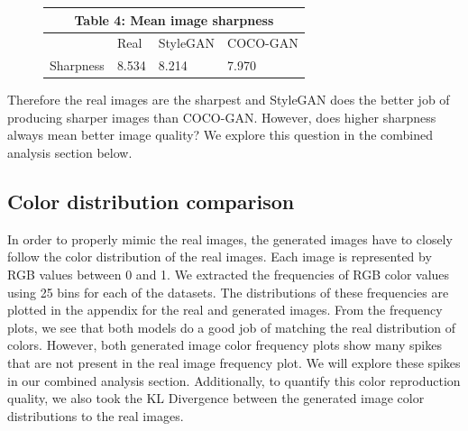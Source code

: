 \documentclass{article}
\begin{document}
        \begin{figure}[H]
            \centering
            \begin{tabular}{ |p{2cm}|p{2cm}|p{2cm}|p{2cm}|  }
                 \hline
                 \multicolumn{4}{|c|}{Table 4: Mean image sharpness} \\
                 \hline
                & Real & StyleGAN & COCO-GAN  \\
                \hline
                Sharpness & 8.534    & 8.214      & 7.970\\
                \hline
            \end{tabular}
        \end{figure}
        
        Therefore the real images are the sharpest and StyleGAN does the better job of producing sharper images than COCO-GAN.
        However, does higher sharpness always mean better image quality?
        We explore this question in the combined analysis section below.

        \subsection{Color distribution comparison}
        \label{subsec:colorDistribution}
        In order to properly mimic the real images, the generated images have to closely follow the color distribution of the real images. Each image is represented by RGB values between 0 and 1. We extracted the frequencies of RGB color values using 25 bins for each of the datasets. The distributions of these frequencies are plotted in the appendix for the real and generated images. 
        From the frequency plots, we see that both models do a good job of matching the real distribution of colors.
        However, both generated image color frequency plots show many spikes that are not present in the real image frequency plot.
        We will explore these spikes in our combined analysis section. Additionally, to quantify this color reproduction quality, we also took the KL Divergence between the generated image color distributions to the real images.
        
\end{document}
